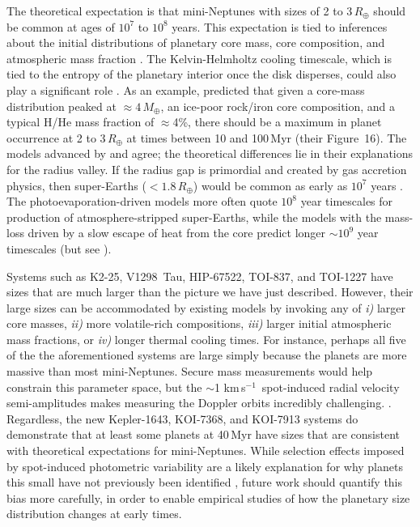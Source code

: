 \documentclass[12pt,twocolumn]{aastex63}
\newcommand{\kms}{\,km\,s$^{-1}$}
\begin{document}
The theoretical expectation is that mini-Neptunes with sizes of 2 to
3\,$R_\oplus$ should be common at ages of $10^7$ to $10^8$ years.
This expectation is tied to inferences about the
initial distributions of planetary core mass, core composition, and
atmospheric mass fraction \citep{owen_evaporation_2017}.  The
Kelvin-Helmholtz cooling timescale, which is tied to the entropy of
the planetary interior once the disk disperses, could also play a
significant role \citep{owen_constraining_2020}.  As an example,
\citet{rogers_unveiling_2021} predicted that given a core-mass
distribution peaked at $\approx$$4$\,$M_\oplus$, an ice-poor rock/iron
core composition, and a typical H/He mass fraction of $\approx$4\%,
there should be a maximum in planet occurrence at 2 to 3\,$R_\oplus$
at times between 10 and 100\,Myr
(their Figure~16).  The models advanced by
\citet{gupta_signatures_2020} and \citet{lee_primordial_2021} agree;
the theoretical differences lie in their explanations
for the radius valley.  If the radius gap is primordial
and created by gas accretion physics, then super-Earths
($<$$1.8$\,$R_\oplus$) would be common as early as $10^7$ years
\citep{lee_primordial_2021}.   The photoevaporation-driven models more
often quote $10^8$ year timescales for production of
atmosphere-stripped super-Earths, while the models with the mass-loss
driven by a slow escape of heat from the core predict longer
$\sim$$10^9$ year timescales (but see \citealt{king_euv_2020}).

Systems such as K2-25, V1298~Tau, HIP-67522, TOI-837,
and TOI-1227 have sizes that are much larger than the picture we have
just described.  However, their large sizes can be accommodated
by existing models by invoking any of {\it i)} larger core masses,
{\it ii)} more volatile-rich compositions, {\it iii)}  larger initial
atmospheric mass fractions, or {\it iv)} longer thermal cooling times.
For instance, perhaps all five of the the aforementioned systems are
large simply because the planets are more massive than most
mini-Neptunes.  Secure mass measurements would help constrain this
parameter space, but the $\sim$1\,\kms\ spot-induced radial velocity
semi-amplitudes makes measuring the Doppler orbits incredibly
challenging.  \citep[][]{cale_diving_2021,zicher_one_2022,klein_one_2022}.
Regardless, the new Kepler-1643, KOI-7368, and KOI-7913 systems do
demonstrate that at least some planets at 40\,Myr have sizes that are
consistent with theoretical expectations for mini-Neptunes.  While
selection effects imposed by spot-induced photometric variability are
a likely explanation for why planets this small have not previously
been identified \citep[{e.g.},][]{zhou_2021_tois}, future work
should quantify this bias more carefully, in order to enable empirical
studies of how the planetary size distribution changes at early times.
\end{document}
